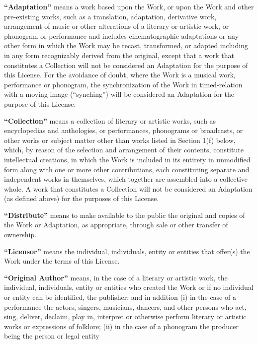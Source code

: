 \begin{doclicense@enumerate}
\item \textbf{``Adaptation''} means a work based upon
the Work, or upon the Work and other pre-existing works,
such as a translation, adaptation, derivative work,
arrangement of music or other alterations of a literary
or artistic work, or phonogram or performance and
includes cinematographic adaptations or any other form in
which the Work may be recast, transformed, or adapted
including in any form recognizably derived from the
original, except that a work that constitutes a
Collection will not be considered an Adaptation for the
purpose of this License. For the avoidance of doubt,
where the Work is a musical work, performance or
phonogram, the synchronization of the Work in
timed-relation with a moving image (``synching'') will be
considered an Adaptation for the purpose of this
License.
\item \textbf{``Collection''} means a collection of
literary or artistic works, such as encyclopedias and
anthologies, or performances, phonograms or broadcasts,
or other works or subject matter other than works listed
in Section 1(f) below, which, by reason of the selection
and arrangement of their contents, constitute
intellectual creations, in which the Work is included in
its entirety in unmodified form along with one or more
other contributions, each constituting separate and
independent works in themselves, which together are
assembled into a collective whole. A work that
constitutes a Collection will not be considered an
Adaptation (as defined above) for the purposes of this
License.
\item \textbf{``Distribute''} means to make available
to the public the original and copies of the Work or
Adaptation, as appropriate, through sale or other
transfer of ownership.
\item \textbf{``Licensor''} means the individual,
individuals, entity or entities that offer(s) the Work
under the terms of this License.
\item \textbf{``Original Author''} means, in the case
of a literary or artistic work, the individual,
individuals, entity or entities who created the Work or
if no individual or entity can be identified, the
publisher; and in addition (i) in the case of a
performance the actors, singers, musicians, dancers, and
other persons who act, sing, deliver, declaim, play in,
interpret or otherwise perform literary or artistic works
or expressions of folklore; (ii) in the case of a
phonogram the producer being the person or legal entity

\end{doclicense@enumerate}
